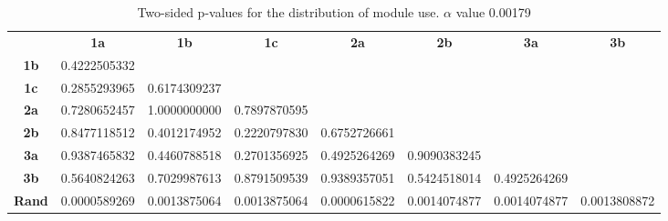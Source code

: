 \begin{table}[h!]
    \centering
    \begin{tabular}{cccccccc}
                  & \textbf{1a}  & \textbf{1b}  & \textbf{1c}  & \textbf{2a}  & \textbf{2b}  & \textbf{3a}  & \textbf{3b}  \\
    \textbf{1b}   & 0.4222505332 &              &              &              &              &              &              \\
    \textbf{1c}   & 0.2855293965 & 0.6174309237 &              &              &              &              &              \\
    \textbf{2a}   & 0.7280652457 & 1.0000000000 & 0.7897870595 &              &              &              &              \\
    \textbf{2b}   & 0.8477118512 & 0.4012174952 & 0.2220797830 & 0.6752726661 &              &              &              \\
    \textbf{3a}   & 0.9387465832 & 0.4460788518 & 0.2701356925 & 0.4925264269 & 0.9090383245 &              &              \\
    \textbf{3b}   & 0.5640824263 & 0.7029987613 & 0.8791509539 & 0.9389357051 & 0.5424518014 & 0.4925264269 &              \\
    \textbf{Rand} & 0.0000589269 & 0.0013875064 & 0.0013875064 & 0.0000615822 & 0.0014074877 & 0.0014074877 & 0.0013808872
    \end{tabular}
    \caption{Two-sided p-values for the distribution of module use. \(\alpha\) value 0.00179}
    \label{tab:exp2.capacityptable}
\end{table}
